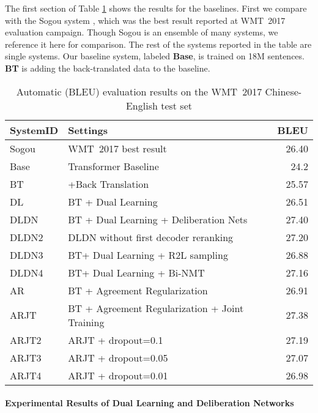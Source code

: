 \documentclass[a4paper]{article}
\begin{document}
\begin{CJK*}{UTF8}{gbsn}
The first section of Table \ref{exp_results} shows the results for the baselines. First we compare with the Sogou system \cite{wang-EtAl:2017:WMT}, which was the best result reported at WMT~2017 evaluation campaign. Though Sogou is an ensemble of many systems, we reference it here for comparison. The rest of the systems reported in the table are single systems. Our baseline system, labeled \textbf{Base}, is  trained on 18M sentences. \textbf{BT} is adding the back-translated data to the baseline.

\begin{table}[ht]
\centering

\begin{tabular}{@{}llr@{}}
\textbf{SystemID} &\textbf{Settings}                                       & \textbf{BLEU} \\
\toprule
Sogou &WMT~2017 best result {\cite{wang-EtAl:2017:WMT}}    & 26.40    \\
Base & Transformer Baseline    & 24.2       \\ 
BT & +Back Translation     & 25.57                \\
\midrule
DL & BT + Dual Learning     & 26.51 \\
DLDN & BT + Dual Learning + Deliberation Nets & 27.40\\
DLDN2 & DLDN without first decoder reranking & 27.20\\
DLDN3 & BT+ Dual Learning + R2L sampling & 26.88\\
DLDN4 & BT+ Dual Learning + Bi-NMT  & 27.16\\
\midrule
AR & BT + Agreement Regularization   & 26.91          \\ 
ARJT & BT + Agreement Regularization + Joint Training  & 27.38\\
ARJT2 & ARJT + dropout=0.1 & 27.19\\
ARJT3 & ARJT + dropout=0.05 & 27.07\\
ARJT4 & ARJT + dropout=0.01 & 26.98\\
\bottomrule

\end{tabular}

\caption{Automatic (BLEU) evaluation results on the WMT~2017 Chinese-English test set}
\label{exp_results}
\end{table}




\paragraph{Experimental Results of Dual Learning and Deliberation Networks}\mbox{}\\


\end{CJK*}
\end{document}
